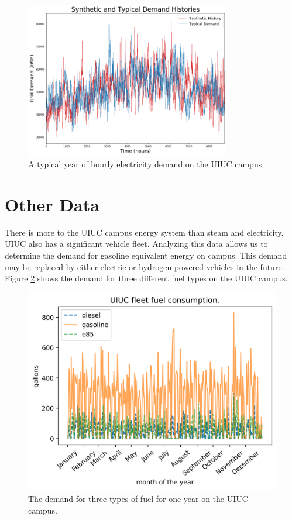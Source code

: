 	\begin{figure}[H]
	  \centering
	  \includegraphics[width=0.8\textwidth]{./figures/syntypdemand.png}
	  \caption{A typical year of hourly electricity demand on the UIUC campus}
	  \label{fig:synelc}
	\end{figure}

\section{Other Data}
	There is more to the UIUC campus energy system than steam and electricity. UIUC
	also has a significant vehicle fleet. Analyzing this data allows us to determine
	the demand for gasoline equivalent energy on campus. This demand may be replaced
	by either electric or hydrogen powered vehicles in the future. Figure
	\ref{fig:fueldemand} shows the demand for three different fuel types on the UIUC
	campus.

	\begin{figure}[H]
	  \centering
	  \includegraphics[width=\textwidth]{./figures/uiuc_fueldemand.png}
	  \caption{The demand for three types of fuel for one year on the UIUC campus.}
	  \label{fig:fueldemand}
	\end{figure}

